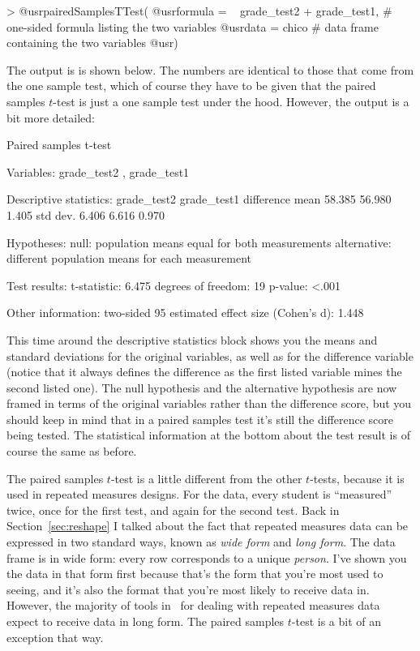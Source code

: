 \begin{rblock1}
> @usr{pairedSamplesTTest( }
     @usr{formula = ~ grade_test2 + grade_test1,} # one-sided formula listing the two variables
     @usr{data = chico}                           # data frame containing the two variables 
  @usr{)}
\end{rblock1}
The output is is shown below. The numbers are identical to those that come from the one sample test, which of course they have to be given that the paired samples $t$-test is just a one sample test under the hood. However, the output is a bit more detailed:
\begin{rblock1}
   Paired samples t-test 

Variables:  grade_test2 , grade_test1 

Descriptive statistics: 
            grade_test2 grade_test1 difference
   mean          58.385      56.980      1.405
   std dev.       6.406       6.616      0.970

Hypotheses: 
   null:        population means equal for both measurements
   alternative: different population means for each measurement

Test results: 
   t-statistic:  6.475 
   degrees of freedom:  19 
   p-value:  <.001 

Other information: 
   two-sided 95%
   estimated effect size (Cohen's d):  1.448 
\end{rblock1}
This time around the descriptive statistics block shows you the means and standard deviations for the original variables, as well as for the difference variable (notice that it always defines the difference as the first listed variable mines the second listed one). The null hypothesis and the alternative hypothesis are now framed in terms of the original variables rather than the difference score, but you should keep in mind that in a paired samples test it's still the difference score being tested. The statistical information at the bottom about the test result is of course the same as before.



The paired samples $t$-test is a little different from the other $t$-tests, because it is used in repeated measures designs. For the  data, every student is ``measured'' twice, once for the first test, and again for the second test. Back in Section~\ref{sec:reshape} I talked about the fact that repeated measures data can be expressed in two standard ways, known as {\it wide form} and {\it long form}. The  data frame is in wide form: every row corresponds to a unique {\it person}. I've shown you the data in that form first because that's the form that you're most used to seeing, and it's also the format that you're most likely to receive data in. However, the majority of tools in \R\ for dealing with repeated measures data expect to receive data in long form. The paired samples $t$-test is a bit of an exception that way. 
 
